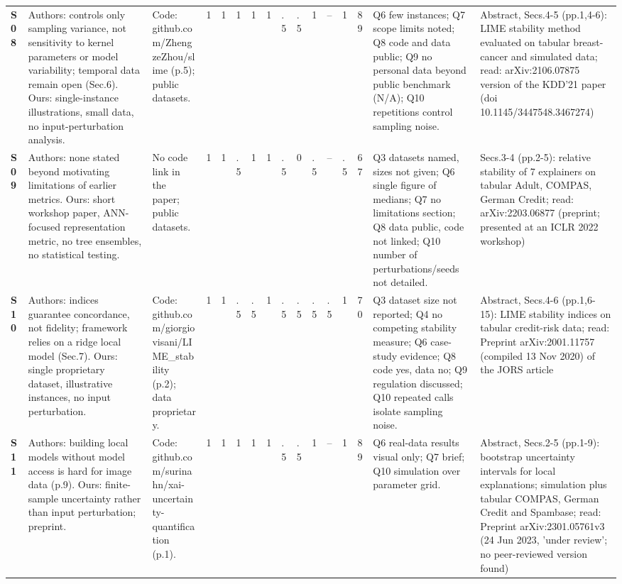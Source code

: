\begin{longtable}{@{}P{1.0cm}P{4.6cm}P{3.6cm}P{0.3cm}P{0.3cm}P{0.3cm}P{0.3cm}P{0.3cm}P{0.3cm}P{0.3cm}P{0.3cm}P{0.3cm}P{0.36cm}P{0.75cm}P{3.0cm}P{3.9cm}@{}}
\textbf{S08} & Authors: controls only sampling variance, not sensitivity to kernel parameters or model variability; temporal data remain open (Sec.6). Ours: single-instance illustrations, small data, no input-perturbation analysis. & Code: github.com/\allowbreak{}ZhengzeZhou/\allowbreak{}slime (p.5); public datasets. & 1 & 1 & 1 & 1 & 1 & .5 & .5 & 1 & -- & 1 & 89 & Q6 few instances; Q7 scope limits noted; Q8 code and data public; Q9 no personal data beyond public benchmark (N/\allowbreak{}A); Q10 repetitions control sampling noise. & Abstract, Secs.4-5 (pp.1,4-6): LIME stability method evaluated on tabular breast-cancer and simulated data; read: arXiv:2106.07875 version of the KDD'21 paper (doi 10.1145/\allowbreak{}3447548.3467274) \\
\textbf{S09} & Authors: none stated beyond motivating limitations of earlier metrics. Ours: short workshop paper, ANN-focused representation metric, no tree ensembles, no statistical testing. & No code link in the paper; public datasets. & 1 & 1 & .5 & 1 & 1 & .5 & 0 & .5 & -- & .5 & 67 & Q3 datasets named, sizes not given; Q6 single figure of medians; Q7 no limitations section; Q8 data public, code not linked; Q10 number of perturbations/\allowbreak{}seeds not detailed. & Secs.3-4 (pp.2-5): relative stability of 7 explainers on tabular Adult, COMPAS, German Credit; read: arXiv:2203.06877 (preprint; presented at an ICLR 2022 workshop) \\
\textbf{S10} & Authors: indices guarantee concordance, not fidelity; framework relies on a ridge local model (Sec.7). Ours: single proprietary dataset, illustrative instances, no input perturbation. & Code: github.com/\allowbreak{}giorgiovisani/\allowbreak{}LIME\_\allowbreak{}stability (p.2); data proprietary. & 1 & 1 & .5 & .5 & 1 & .5 & .5 & .5 & .5 & 1 & 70 & Q3 dataset size not reported; Q4 no competing stability measure; Q6 case-study evidence; Q8 code yes, data no; Q9 regulation discussed; Q10 repeated calls isolate sampling noise. & Abstract, Secs.4-6 (pp.1,6-15): LIME stability indices on tabular credit-risk data; read: Preprint arXiv:2001.11757 (compiled 13 Nov 2020) of the JORS article \\
\textbf{S11} & Authors: building local models without model access is hard for image data (p.9). Ours: finite-sample uncertainty rather than input perturbation; preprint. & Code: github.com/\allowbreak{}surinahn/\allowbreak{}xai-uncertainty-quantification (p.1). & 1 & 1 & 1 & 1 & 1 & .5 & .5 & 1 & -- & 1 & 89 & Q6 real-data results visual only; Q7 brief; Q10 simulation over parameter grid. & Abstract, Secs.2-5 (pp.1-9): bootstrap uncertainty intervals for local explanations; simulation plus tabular COMPAS, German Credit and Spambase; read: Preprint arXiv:2301.05761v3 (24 Jun 2023, 'under review'; no peer-reviewed version found) \\

\end{longtable}
